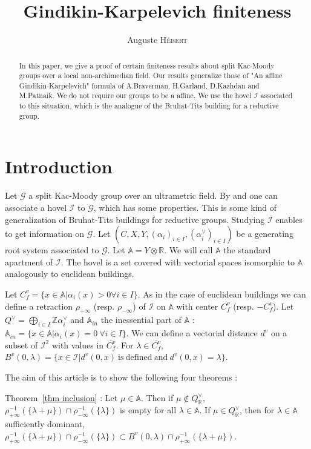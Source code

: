 \documentclass[12pt]{article}
\date{}
\title{Gindikin-Karpelevich finiteness}
\author{Auguste \textsc{Hébert}}
\theoremstyle{plain}
\theoremstyle{definition}
\newcommand{\R}{\mathbb{R}}
\newcommand{\A}{\mathbb{A}}
\newcommand{\Z}{\mathbb{Z}}
\newcommand{\I}{\mathcal{I}}
\begin{document}
\maketitle


\begin{abstract}
In this paper, we give a proof of certain finiteness results about split Kac-Moody groups over a local non-archimedian field. Our results generalize those of "An affine Gindikin-Karpelevich" formula of A.Braverman, H.Garland, D.Kazhdan and M.Patnaik. We do not require our groups to be a affine. We use the hovel $\I$ associated to this situation, which is the analogue of the Bruhat-Tits building for a reductive group.
\end{abstract}

\section{Introduction}

Let $\mathcal{G}$ a split Kac-Moody group over an ultrametric field. By \cite{gaussent2008kac} and \cite{rousseau2012almost} one can associate a hovel $\I$ to $\mathcal{G}$, which has some properties. This is some kind of generalization of Bruhat-Tits buildings for reductive groups. Studying $\I$ enables to get information on $\mathcal{G}$. Let $(C,X,Y,(\alpha_i)_{i\in I},(\alpha_i^\vee)_{i\in I})$ be a generating root system associated to $\mathcal{G}$.  Let $\A=Y\otimes \R$. We will call $\A$ the standard apartment of $\I$. The hovel is a set covered with vectorial spaces isomorphic to $\A$ analogously to euclidean buildings.

Let $C_f^v=\{x\in \A|\alpha_i(x)>0\forall i\in I\}$. As in the case of euclidean buildings we can define a retraction $\rho_{+\infty}$ (resp. $\rho_{-\infty}$) of $\I$ on $\A$ with center $C_f^v$ (resp. $-C_f^v$). Let $Q^\vee=\bigoplus_{i\in I} \Z \alpha_i^\vee$ and $\A_{in}$ the inessential part of $\A$ : $\A_{in}=\{x\in \A |\alpha_i(x)=0\ \forall i\in I\}$. We can define a vectorial distance $d^v$ on a subset of $\I^2$ with values in $\overline{C_f^v}$. For $\lambda\in \overline{C_f^v}$, $B^v(0,\lambda)=\{x\in\I|d^v(0,x)\mathrm{\ is\ defined\ and\ }d^v(0,x)=\lambda\}$.

\vspace{3mm}
 The aim of this article is to show the following four theorems : 
\vspace{3mm}

Theorem~\ref{thm inclusion} :
Let $\mu\in \A$. Then if $\mu\notin Q_{\R}^\vee$, $\rho_{+\infty}^{-1}(\{\lambda+\mu\})\cap \rho_{-\infty}^{-1}(\{\lambda\})$ is empty for all $\lambda\in \A$. If $\mu\in Q^\vee_{\R}$, then for $\lambda\in \A$ sufficiently dominant, $\rho_{+\infty}^{-1}(\{\lambda+\mu\})\cap \rho_{-\infty}^{-1}(\{\lambda\})\subset B^v(0,\lambda)\cap \rho_{+\infty}^{-1}(\{\lambda+\mu\}) $. 
\end{document}
